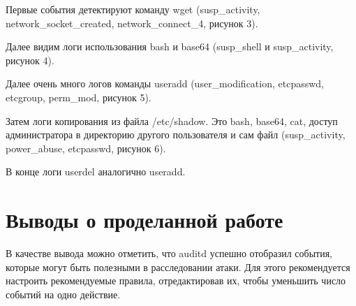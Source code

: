 \FloatBarrier

Первые события детектируют команду wget (susp\_activity, \linebreak network\_socket\_created, network\_connect\_4, рисунок 3).

\FloatBarrier

Далее видим логи использования bash и base64 (susp\_shell и susp\_activity, рисунок 4).

\FloatBarrier

Далее очень много логов команды useradd (user\_modification, etcpasswd, etcgroup, perm\_mod, рисунок 5).

\FloatBarrier

Затем логи копирования из файла /etc/shadow. Это bash, base64, cat, доступ администратора в директорию другого пользователя и сам файл (susp\_activity, \linebreak power\_abuse, etcpasswd, рисунок 6).

\FloatBarrier

В конце логи userdel аналогично useradd.

\section{Выводы о проделанной работе}
В качестве вывода можно отметить, что auditd успешно отобразил события, которые могут быть полезными в расследовании атаки. Для этого рекомендуется настроить рекомендуемые правила, отредактировав их, чтобы уменьшить число событий на одно действие.
